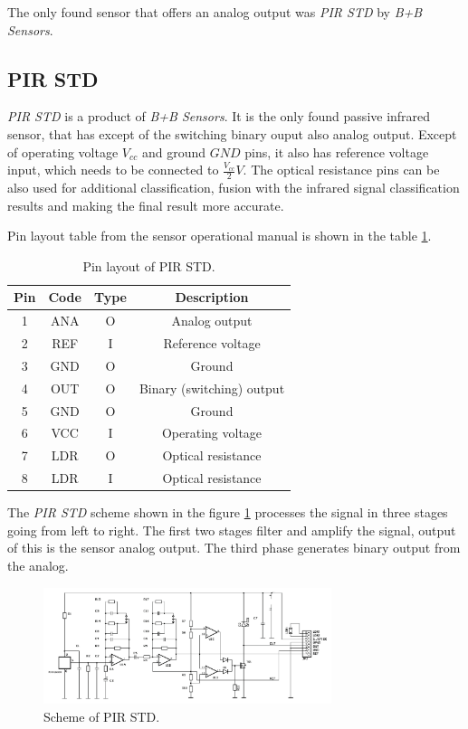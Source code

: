 The only found sensor that offers an analog output was {\it PIR STD} by {\it B+B Sensors}.

\subsection*{PIR STD}
{\it PIR STD} is a product of {\it B+B Sensors}. It is the only found passive infrared
sensor, that has except of the switching binary ouput also analog output. Except of
operating voltage $V_{cc}$ and ground $GND$ pins, it also has reference voltage input,
which needs to be connected to $\frac{V_{cc}}{2} V$. The optical resistance pins can
be also used for additional classification, fusion with the infrared signal classification
results and making the final result more accurate.

Pin layout table from the sensor operational manual is shown in the table \ref{fig:pirstdpin}.

\begin{table}[h!]
\begin{center}
\begin{tabular}{|c c | c | c |} \hline
\textbf{Pin} & \textbf{Code} & \textbf{Type} & \textbf{Description} \\ \hline
1 & ANA & O & Analog output \\ \hline
2 & REF & I & Reference voltage \\ \hline
3 & GND & O & Ground \\ \hline
4 & OUT & O & Binary (switching) output \\ \hline
5 & GND & O & Ground \\ \hline
6 & VCC & I & Operating voltage \\ \hline
7 & LDR & O & Optical resistance \\ \hline
8 & LDR & I & Optical resistance \\ \hline
\end{tabular}
\end{center}
\caption{Pin layout of PIR STD.\cite{PIROperationalManual}\label{fig:pirstdpin}}
\end{table}

The {\it PIR STD} scheme shown in the figure \ref{fig:pirstdscheme} processes the signal
in three stages going from left to right. The first two stages filter and amplify the signal,
output of this is the sensor analog output. The third phase generates binary output from the analog.

\begin{figure}[h!]
\begin{center}
\includegraphics[width=0.75\textwidth]{img/pirstd.png}
\caption{Scheme of PIR STD.\cite{PIROperationalManual}\label{fig:pirstdscheme}}
\end{center}
\end{figure}

